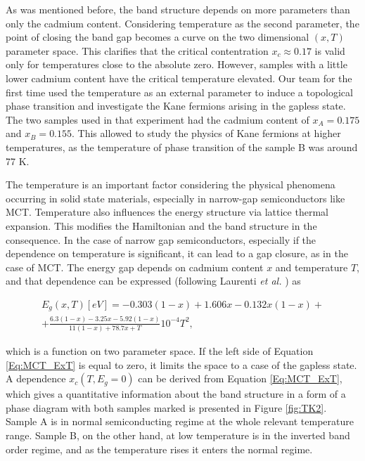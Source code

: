 \documentclass[titlepage,a4paper]{book}
\begin{document}
As was mentioned before, the band structure depends on more parameters than only the cadmium content. Considering temperature as the second parameter, the point of closing the band gap becomes a curve on the two dimensional $(x, T)$ parameter space. This clarifies that the critical contentration $x_c \approx 0.17$ is valid only for temperatures close to the absolute zero. However, samples with a little lower cadmium content have the critical temperature elevated. Our team \cite{Teppe_MCT} for the first time used the temperature as an external parameter to induce a topological phase transition and investigate the Kane fermions arising in the gapless state. The two samples used in that experiment had the cadmium content of $x_A = 0.175$ and $x_B = 0.155$. This allowed to study the physics of Kane fermions at higher temperatures, as the temperature of phase transition of the sample B was around 77 K.  

The temperature is an important factor considering the physical phenomena occurring in solid state materials, especially in narrow-gap semiconductors like MCT. Temperature also influences the energy structure via lattice thermal expansion. This modifies the Hamiltonian and the band structure in the consequence. In the case of narrow gap semiconductors, especially if the dependence on temperature is significant, it can lead to a gap closure, as in the case of MCT. The energy gap depends on cadmium content $x$ and temperature $T$, and that dependence can be expressed (following Laurenti \textit{et al.} \cite{Laurenti_MCT_bulk}) as

\begin{equation}
\begin{aligned}
\label{Eq:MCT_ExT}
E_g (x,T)[eV] = -0.303(1-x) + 1.606x - 0.132x(1-x) +\\ +\frac{6.3(1-x)-3.25x-5.92(1-x)}{11(1-x)+78.7x+T}10^{-4}T^2,
\end{aligned}
\end{equation}

which is a function on two parameter space. If the left side of Equation \ref{Eq:MCT_ExT} is equal to zero, it limits the space to a case of the gapless state. A dependence $x_c(T, E_g = 0)$ can be derived from Equation \ref{Eq:MCT_ExT}, which gives a quantitative information about the band structure in a form of a phase diagram with both samples marked is presented in Figure \ref{fig:TK2}. Sample A is in normal semiconducting regime at the whole relevant temperature range. Sample B, on the other hand, at low temperature is in the inverted band order regime, and as the temperature rises it enters the normal regime. 
\end{document}
